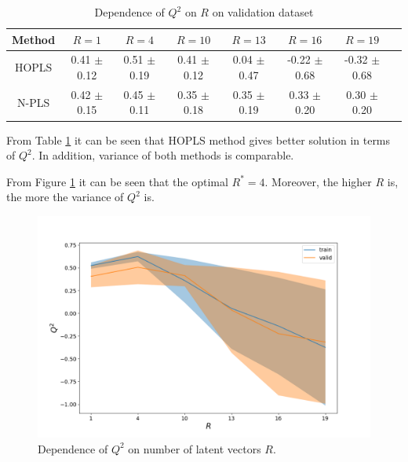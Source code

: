 \documentclass[../../main.tex]{subfiles}
\begin{document}
\begin{table}
\caption{Dependence of $Q^2$ on $R$ on validation dataset}
\label{table}
\begin{tabular}{c|c|c|c|c|c|c|c|}
Method & $R= 1$ & $R= 4$ & $R = 10$ & $R = 13$ & $R = 16$ & $R = 19$\\ \hline
HOPLS  &0.41 $\pm$ 0.12 & 0.51 $\pm$ 0.19&  0.41 $\pm$ 0.12& 0.04 $\pm$ 0.47 & -0.22 $\pm$ 0.68&  -0.32 $\pm$ 0.68 \\
N-PLS & 0.42 $\pm$ 0.15 & 0.45 $\pm$ 0.11 & 0.35 $\pm$ 0.18 & 0.35 $\pm$ 0.19 & 0.33 $\pm$ 0.20 & 0.30 $\pm$ 0.20    
\end{tabular}
\end{table}

From Table \ref{table} it can be seen that HOPLS method gives better solution in terms of $Q^2$. In addition, variance of both methods is comparable.

From Figure \ref{fig:exp_1} it can be seen that the optimal $R^* = 4$. Moreover, the higher $R$ is, the more the variance of $Q^2$ is.
\begin{figure}[h!]
\centering
\includegraphics[width=1\textwidth]{figures/cross_val}
\caption{Dependence of $Q^2$ on number of latent vectors $R$.}
\label{fig:exp_1}
\end{figure}

%
\end{document}
